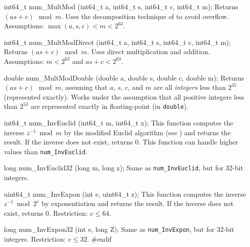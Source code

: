 int64_t num_MultMod (int64_t a, int64_t s, int64_t c, int64_t m);
\endcode
\tab  Returns $(as + c) \mod m$.  Uses the decomposition technique
  of \cite{rLEC91a} to avoid overflow. 
	Assumptions: $\max(a,s,c) < m < 2^{63}$.
\endtab
\code

int64_t num_MultModDirect (int64_t a, int64_t s, int64_t c, int64_t m);
\endcode
\tab  Returns $(as + c) \mod m$.  Uses direct multiplication and addition.
  Assumptions: $m < 2^{63}$ and $as+c < 2^{63}$. 
\endtab
\code

double num_MultModDouble (double a, double s, double c, double m);
\endcode
 \tab  Returns $(as+c) \mod m$, assuming that
  $a$, $s$, $c$, and $m$ are all {\em integers\/} less than $2^{35}$ 
  (represented exactly).
  Works under the assumption that all positive integers less than 
  $2^{53}$ are represented exactly in floating-point (in {\tt double}).
\endtab
\code


int64_t num_InvEuclid (int64_t m, int64_t x);
\endcode
 \tab  This function computes the inverse $z^{-1}\bmod m$ by the 
  modified Euclid algorithm (see \cite[p. 325]{iKNU81a}) and returns
  the result. If the inverse does not exist, returns 0. This function
  can handle higher values than {\tt num\_InvEuclid}.
\endtab
\code

long num_InvEuclid32 (long m, long z);
\endcode
 \tab  Same as \texttt{num\_InvEuclid}, but for 32-bit integers.   
\endtab
\code

uint64_t num_InvExpon (int e, uint64_t z);
\endcode
 \tab
  This function computes the inverse  $z^{-1} \bmod 2^e$
  by exponentiation  and returns the result. If the inverse does not  exist, returns 0.
  Restriction: $e \le 64$.
 \endtab
\code

 long num_InvExpon32 (int e, long Z);
 \endcode
 \tab  Same as \texttt{num\_InvExpon}, but for 32-bit integers.
  Restriction: $e \le 32$.   
\endtab
\code\hide
#endif
\endhide\endcode
